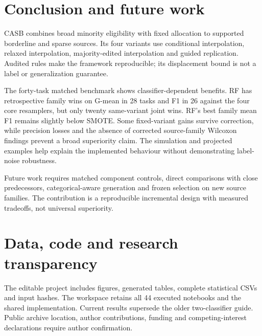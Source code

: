 \documentclass[conference]{IEEEtran}
\begin{document}
\section{Conclusion and future work}
CASB combines broad minority eligibility with fixed allocation to supported borderline and sparse sources. Its four variants use conditional interpolation, relaxed interpolation, majority-edited interpolation and guided replication. Audited rules make the framework reproducible; its displacement bound is not a label or generalization guarantee.

The forty-task matched benchmark shows classifier-dependent benefits. RF has retrospective family wins on G-mean in 28 tasks and F1 in 26 against the four core resamplers, but only twenty same-variant joint wins. RF's best family mean F1 remains slightly below SMOTE. Some fixed-variant gains survive correction, while precision losses and the absence of corrected source-family Wilcoxon findings prevent a broad superiority claim. The simulation and projected examples help explain the implemented behaviour without demonstrating label-noise robustness.

Future work requires matched component controls, direct comparisons with close predecessors, categorical-aware generation and frozen selection on new source families. The contribution is a reproducible incremental design with measured tradeoffs, not universal superiority.

\section*{Data, code and research transparency}
The editable project includes figures, generated tables, complete statistical CSVs and input hashes. The workspace retains all 44 executed notebooks and the shared implementation. Current results supersede the older two-classifier guide. Public archive location, author contributions, funding and competing-interest declarations require author confirmation.


\clearpage
\balance


\end{document}
